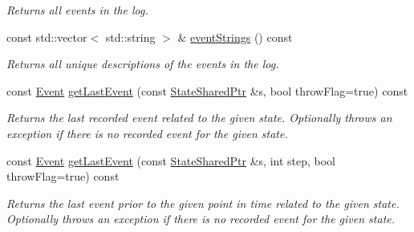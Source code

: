 \begin{DoxyCompactItemize}
\begin{DoxyCompactList}\small\item\em Returns all events in the log. \end{DoxyCompactList}\item 
const std\+::vector$<$ std\+::string $>$ \& \hyperlink{structslb_1_1core_1_1ui_1_1AlgorithmLog_ad5c1c00ecc6530df1ab3aeb702e749ec}{event\+Strings} () const 
\begin{DoxyCompactList}\small\item\em Returns all unique descriptions of the events in the log. \end{DoxyCompactList}\item 
const \hyperlink{structslb_1_1core_1_1ui_1_1AlgorithmLog_aa495893d6c587c69280c82dd4f1684ff}{Event} \hyperlink{structslb_1_1core_1_1ui_1_1AlgorithmLog_a6df747934dc34719df23fdb6a46343c5}{get\+Last\+Event} (const \hyperlink{structslb_1_1core_1_1ui_1_1AlgorithmLog_acb46cb3c44c97ddbb219e4c0120e87e3}{State\+Shared\+Ptr} \&s, bool throw\+Flag=true) const 
\begin{DoxyCompactList}\small\item\em Returns the last recorded event related to the given state. Optionally throws an exception if there is no recorded event for the given state. \end{DoxyCompactList}\item 
const \hyperlink{structslb_1_1core_1_1ui_1_1AlgorithmLog_aa495893d6c587c69280c82dd4f1684ff}{Event} \hyperlink{structslb_1_1core_1_1ui_1_1AlgorithmLog_a8ac48eaa1dba54505b6588918c055b82}{get\+Last\+Event} (const \hyperlink{structslb_1_1core_1_1ui_1_1AlgorithmLog_acb46cb3c44c97ddbb219e4c0120e87e3}{State\+Shared\+Ptr} \&s, int step, bool throw\+Flag=true) const 
\begin{DoxyCompactList}\small\item\em Returns the last event prior to the given point in time related to the given state. Optionally throws an exception if there is no recorded event for the given state. \end{DoxyCompactList}\end{DoxyCompactItemize}
